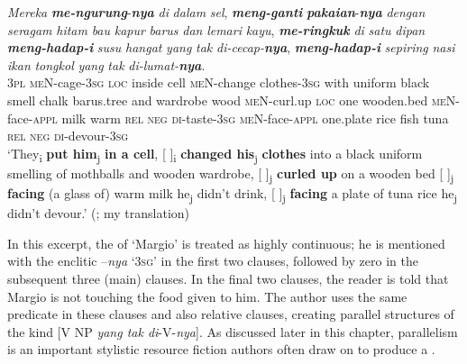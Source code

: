 \documentclass[output=paper
,modfonts
,nonflat]{langsci/langscibook}
\begin{document}
\begin{exe}
	\ex\label{e:djenar:15}
	\gll \textit{Mereka} \textbf{\textit{me-ngurung}}-\textbf{\textit{nya}} \textit{di} \textit{dalam} \textit{sel}, \textbf{\textit{meng-ganti}}   \textbf{\textit{pakaian}}-\textbf{\textit{nya}} \textit{dengan} \textit{seragam} \textit{hitam} \textit{bau} \textit{kapur} \textit{barus} \textit{dan}   \textit{lemari} \textit{kayu}, \textbf{\textit{me-ringkuk}} \textit{di} \textit{satu} \textit{dipan} \textbf{\textit{meng-hadap-i}} \textit{susu} \textit{hangat} \textit{yang} \textit{tak} \textit{di-cecap-}\textbf{\textit{nya}}, \textbf{\textit{meng-hadap-i}} \textit{sepiring} \textit{nasi} \textit{ikan} \textit{tongkol} \textit{yang} \textit{tak} \textit{di-lumat-}\textbf{\textit{nya}}.\\
	\textsc{3pl} \textsc{meN}-cage-\textsc{3sg} \textsc{loc} inside cell \textsc{meN}-change clothes-\textsc{3sg} with uniform black smell chalk  barus.tree and wardrobe wood  \textsc{meN}-curl.up \textsc{loc} one wooden.bed \textsc{meN}-face-\textsc{appl} milk warm \textsc{rel} \textsc{neg} \textsc{di}{}-taste-\textsc{3sg} \textsc{meN}{}-face-\textsc{appl} one.plate rice fish tuna \textsc{rel} \textsc{neg}  \textsc{di}-devour-\textsc{3sg}\\
	\glt ‘They\textsubscript{i} \textbf{put him}{\textsubscript{j}} \textbf{in a cell}, [ ]\textsubscript{i} \textbf{changed his}{\textsubscript{j}} \textbf{clothes} into a black uniform smelling of mothballs and wooden wardrobe, [ ]\textsubscript{j} \textbf{curled up} on a wooden bed [ ]\textsubscript{j} \textbf{facing} (a glass of) warm milk he{\textsubscript{j}} didn’t drink, [ ]\textsubscript{j} \textbf{facing} a plate of tuna rice he{\textsubscript{j}} didn’t devour.’ \hfill (\citealt[37]{Kurniawan2004}; my translation)
\end{exe}

\noindent
In this excerpt, the  of ‘Margio’ is treated as highly continuous; he is mentioned with the enclitic –\textit{nya} ‘\textsc{3sg}’ in the first two clauses, followed by zero in the subsequent three (main) clauses. In the final two clauses, the reader is told that Margio is not touching the food given to him. The author uses the same predicate in these clauses and also relative clauses, creating parallel structures of the kind [V NP \textit{yang tak di}-V-\textit{nya}]. As discussed later in this chapter, parallelism is an important stylistic resource fiction authors often draw on to produce a . 
\end{document}
